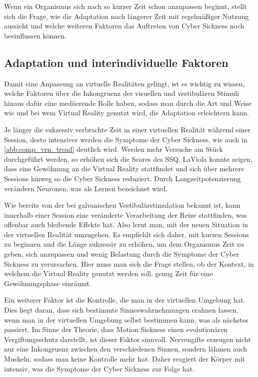 Wenn ein Organismus sich nach so kurzer Zeit schon anzupassen beginnt, stellt sich die Frage, wie die Adaptation nach l\"angerer Zeit mit regelm\"a{\ss}iger Nutzung aussieht und welche weiteren Faktoren das Auftreten von Cyber Sickness noch beeinflussen k\"onnen.

\subsection{Adaptation und interindividuelle Faktoren}\label{Adaptation}

Damit eine Anpassung an virtuelle Realit\"aten gelingt, ist es wichtig zu wissen, welche Faktoren \"uber die Inkongruenz der visuellen und vestibul\"aren Stimuli hinaus daf\"ur eine mediierende Rolle haben, sodass man durch die Art und Weise wie und bei wem Virtual Reality genutzt wird, die Adaptation erleichtern kann.

Je l\"anger die sukzessiv verbrachte Zeit in einer virtuellen Realit\"at w\"ahrend einer Session, desto intensiver werden die Symptome der Cyber Sickness\cite{Aldaba:2017:VRNTreadGraphic}, wie auch in \autoref{abb:comp_vrn_tread} deutlich wird. Werden mehr Versuche am St\"uck durchgef\"uhrt werden, so erh\"ohen sich die Scores des SSQ. LaViola\cite{LaViola:2000:CSinVR} konnte zeigen, dass eine Gew\"ohnung an die Virtual Reality stattfindet und sich \"uber mehrere Sessions hinweg so die Cyber Sickness reduziert.
Durch Langzeitpotenzierung ver\"andern Neuronen, was als Lernen bezeichnet wird. 

Wie bereits von der bei galvanischen Vestibul\"arstimulation bekannt ist, kann innerhalb einer Session eine ver\"anderte Verarbeitung der Reize stattfinden, was offenbar auch bleibende Effekte hat. Also lernt man, mit der neuen Situation in der virtuellen Realit\"at umzugehen.
Es empfiehlt sich daher, mit kurzen Sessions zu beginnen und die L\"ange sukzessiv zu erh\"ohen, um dem Organismus Zeit zu geben, sich anzupassen und wenig Belastung durch die Symptome der Cyber Sickness zu verursachen.
Hier muss man sich die Frage stellen, ob der Kontext, in welchem die Virtual Reality genutzt werden soll, genug Zeit f\"ur eine Gew\"ohnungsphase einr\"aumt.

Ein weiterer Faktor ist die Kontrolle, die man in der virtuellen Umgebung hat\cite{Kolasinski:1995:control}. Dies liegt daran, dass sich bestimmte Sinneswahrnehmungen erahnen lassen, wenn man in der virtuellen Umgebung selbst bestimmen kann, was als n\"achstes passiert. Im Sinne der Theorie, dass Motion Sickness einen evolution\"aren Vergiftungsschutz darstellt, ist dieser Faktor sinnvoll. Nervengifte erzeugen nicht nur eine Inkongruenz zwischen den verschiedenen Sinnen, sondern l\"ahmen auch Muskeln, sodass man keine Kontrolle mehr hat. Daher reagiert der K\"orper mit intensiv, was die Symptome der Cyber Sickness zur Folge hat.

